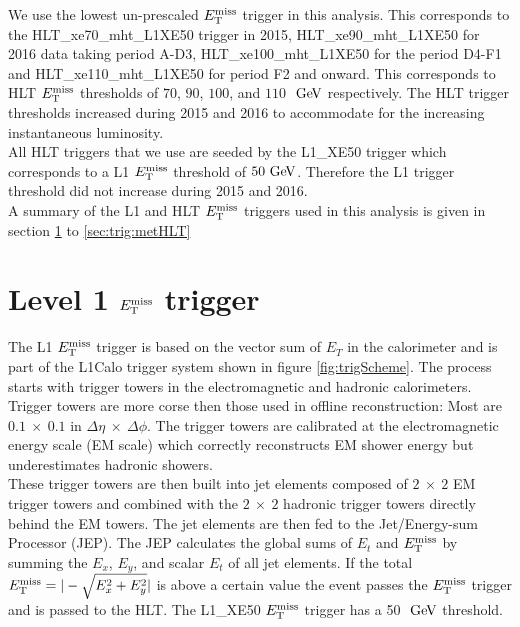 \indent We use the lowest un-prescaled $E_{\mathrm{T}}^{\mathrm{miss}}$ trigger in this analysis.  This corresponds to the {\sc HLT\_xe70\_mht\_L1XE50} trigger in 2015,  {\sc HLT\_xe90\_mht\_L1XE50} for 2016 data taking period A-D3, {\sc HLT\_xe100\_mht\_L1XE50} for the period D4-F1 and {\sc HLT\_xe110\_mht\_L1XE50} for period F2 and onward. This corresponds to HLT $E_{\mathrm{T}}^{\mathrm{miss}}$ thresholds of $70$, $90$, $100$, and $110$ $\gev$ respectively.  The HLT trigger thresholds increased during 2015 and 2016 to accommodate for the increasing instantaneous luminosity. \\

\indent All HLT triggers that we use are seeded by the L1\_XE50 trigger which corresponds to a L1 $E_{\mathrm{T}}^{\mathrm{miss}}$ threshold of $50 \gev$.  Therefore the L1 trigger threshold did not increase during 2015 and 2016.  \\

\indent A summary of the L1 and HLT $E_{\mathrm{T}}^{\mathrm{miss}}$ triggers used in this analysis is given in section \ref{sec:trig:L1Calo} to \ref{sec:trig:metHLT}\\

\section{Level 1 $E_{\mathrm{T}}^{\mathrm{miss}}$ trigger}
\label{sec:trig:L1Calo}

\indent The L1 $E_{\mathrm{T}}^{\mathrm{miss}}$ trigger is based on the vector sum of $E_T$ in the calorimeter and is part of the L1Calo trigger system \cite{L1Calo} shown in figure \ref{fig:trigScheme}.  The process starts with trigger towers in the electromagnetic and hadronic calorimeters.  Trigger towers are more corse then those used in offline reconstruction: Most are $0.1~\times~0.1$ in $\Delta\eta~\times~\Delta\phi$.  The trigger towers are calibrated at the electromagnetic energy scale (EM scale) which correctly reconstructs EM shower energy but underestimates hadronic showers.  \\

\indent These trigger towers are then built into jet elements composed of $2~\times~2$ EM trigger towers and combined with the $2~\times~2$ hadronic trigger towers directly behind the EM towers. The jet elements are then fed to the Jet/Energy-sum Processor (JEP).  The JEP calculates the global sums of $E_t$ and $E_{\mathrm{T}}^{\mathrm{miss}}$ by summing the $E_x$, $E_y$, and scalar $E_t$ of all jet elements.  If the total $E_{\mathrm{T}}^{\mathrm{miss}} = |- \sqrt{E_x^2+E_y^2}|$ is above a certain value the event passes the $E_{\mathrm{T}}^{\mathrm{miss}}$ trigger and is passed to the HLT.  The L1\_XE50 $E_{\mathrm{T}}^{\mathrm{miss}}$ trigger has a 50 $\gev$ threshold. \\


